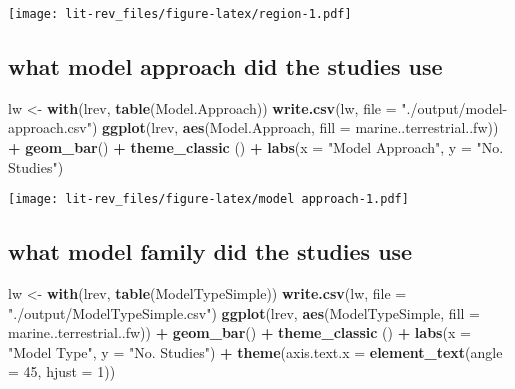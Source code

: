 \documentclass[
]{article}
\newenvironment{Shaded}{\begin{snugshade}}{\end{snugshade}}
\newcommand{\DataTypeTok}[1]{\textcolor[rgb]{0.13,0.29,0.53}{#1}}
\newcommand{\DecValTok}[1]{\textcolor[rgb]{0.00,0.00,0.81}{#1}}
\newcommand{\KeywordTok}[1]{\textcolor[rgb]{0.13,0.29,0.53}{\textbf{#1}}}
\newcommand{\NormalTok}[1]{#1}
\newcommand{\OperatorTok}[1]{\textcolor[rgb]{0.81,0.36,0.00}{\textbf{#1}}}
\newcommand{\StringTok}[1]{\textcolor[rgb]{0.31,0.60,0.02}{#1}}
\begin{document}
\texttt{[image: lit-rev\_files/figure-latex/region-1.pdf]}

\hypertarget{what-model-approach-did-the-studies-use}{%
\subsection{what model approach did the studies
use}\label{what-model-approach-did-the-studies-use}}

\begin{Shaded}
\begin{Highlighting}[]
\NormalTok{lw <-}\StringTok{ }\KeywordTok{with}\NormalTok{(lrev, }\KeywordTok{table}\NormalTok{(Model.Approach))}
\KeywordTok{write.csv}\NormalTok{(lw, }\DataTypeTok{file =} \StringTok{"./output/model-approach.csv"}\NormalTok{)}
\KeywordTok{ggplot}\NormalTok{(lrev, }\KeywordTok{aes}\NormalTok{(Model.Approach, }\DataTypeTok{fill =}\NormalTok{ marine..terrestrial..fw)) }\OperatorTok{+}\StringTok{ }\KeywordTok{geom_bar}\NormalTok{() }\OperatorTok{+}\StringTok{ }\KeywordTok{theme_classic}\NormalTok{ () }\OperatorTok{+}\StringTok{ }\KeywordTok{labs}\NormalTok{(}\DataTypeTok{x =} \StringTok{"Model Approach"}\NormalTok{, }\DataTypeTok{y =} \StringTok{"No. Studies"}\NormalTok{)}
\end{Highlighting}
\end{Shaded}

\texttt{[image: lit-rev\_files/figure-latex/model approach-1.pdf]}

\hypertarget{what-model-family-did-the-studies-use}{%
\subsection{what model family did the studies
use}\label{what-model-family-did-the-studies-use}}

\begin{Shaded}
\begin{Highlighting}[]
\NormalTok{lw <-}\StringTok{ }\KeywordTok{with}\NormalTok{(lrev, }\KeywordTok{table}\NormalTok{(ModelTypeSimple))}
\KeywordTok{write.csv}\NormalTok{(lw, }\DataTypeTok{file =} \StringTok{"./output/ModelTypeSimple.csv"}\NormalTok{)}
\KeywordTok{ggplot}\NormalTok{(lrev, }\KeywordTok{aes}\NormalTok{(ModelTypeSimple, }\DataTypeTok{fill =}\NormalTok{ marine..terrestrial..fw)) }\OperatorTok{+}\StringTok{ }\KeywordTok{geom_bar}\NormalTok{() }\OperatorTok{+}\StringTok{ }\KeywordTok{theme_classic}\NormalTok{ () }\OperatorTok{+}\StringTok{ }\KeywordTok{labs}\NormalTok{(}\DataTypeTok{x =} \StringTok{"Model Type"}\NormalTok{, }\DataTypeTok{y =} \StringTok{"No. Studies"}\NormalTok{) }\OperatorTok{+}\StringTok{ }\KeywordTok{theme}\NormalTok{(}\DataTypeTok{axis.text.x =} \KeywordTok{element_text}\NormalTok{(}\DataTypeTok{angle =} \DecValTok{45}\NormalTok{, }\DataTypeTok{hjust =} \DecValTok{1}\NormalTok{))}
\end{Highlighting}
\end{Shaded}
\end{document}

